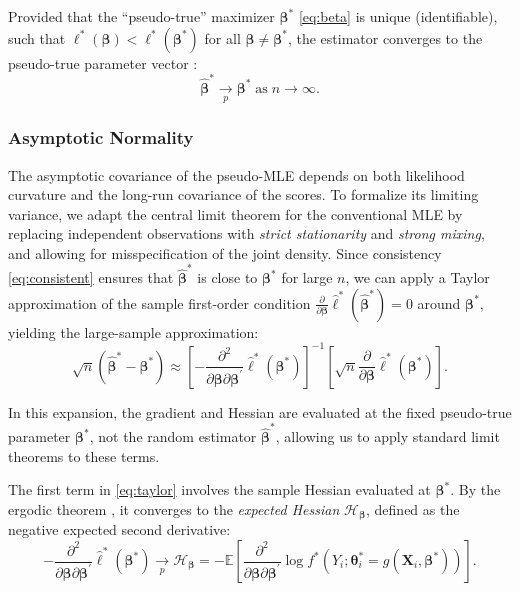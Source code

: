 \documentclass[00-main.tex]{subfiles}
\begin{document}
Provided that the ``pseudo-true'' maximizer $\bm\beta^*$ \eqref{eq:beta} is unique (identifiable), such that $\ell^*(\bm\beta) < \ell^*(\bm\beta^*)$ for all $\bm\beta\ne\bm\beta^*$, the estimator converges to the pseudo-true parameter vector \citep[Theorem~10.8]{hansen_probability_2022}:
\begin{equation}\label{eq:consistent}
    \hat{\bm{\beta}}^* \underset{p}{\to} \bm{\beta}^*\;\text{as}\;n\to\infty.
\end{equation}

\subsubsection{Asymptotic Normality}
The asymptotic covariance of the pseudo-MLE depends on both likelihood curvature and the long-run covariance of the scores. To formalize its limiting variance, we adapt the central limit theorem for the conventional MLE \citep[Theorem~10.9]{hansen_probability_2022} by replacing independent observations with \emph{strict stationarity} and \emph{strong mixing}, and allowing for misspecification of the joint density. Since consistency \eqref{eq:consistent} ensures that $\hat{\bm\beta}^*$ is close to $\bm\beta^*$ for large $n$, we can apply a Taylor approximation of the sample first-order condition $\frac{\partial}{\partial\bm\beta} \hat\ell^*(\hat{\bm\beta}^*) = 0$ around $\bm\beta^*$, yielding the large-sample approximation:
\begin{equation}\label{eq:taylor}
    \sqrt{n}(\hat{\bm\beta}^* - \bm\beta^*) \approx \left[-\frac{\partial^2}{\partial\bm\beta\partial\bm\beta^\prime} \hat{\ell}^*(\bm\beta^*) \right]^{-1} \left[ \sqrt{n} \frac{\partial}{\partial\bm\beta} \hat{\ell}^*(\bm\beta^*) \right].
\end{equation}

In this expansion, the gradient and Hessian are evaluated at the fixed pseudo-true parameter $\bm\beta^*$, not the random estimator $\hat{\bm\beta}^*$, allowing us to apply standard limit theorems to these terms.

The first term in \eqref{eq:taylor} involves the sample Hessian evaluated at $\bm\beta^*$. By the ergodic theorem \citep[Theorem~14.9]{hansen_econometrics_2022}, it converges to the \emph{expected Hessian} $\mathcal{H}_{\bm\beta}$, defined as the negative expected second derivative:
\begin{equation}
    -\frac{\partial^2}{\partial\bm\beta\partial\bm\beta^\prime} \hat{\ell}^*(\bm\beta^*) \underset{p}{\to} \mathcal{H}_{\bm\beta} = -\mathbb{E}\left[\frac{\partial^2}{\partial\bm\beta\partial\bm\beta^{\prime}} \log f^*(Y_i; \bm\theta^*_i = g(\bm{X}_i, \bm\beta^*))\right].
\end{equation}
\end{document}
